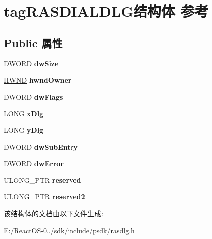 \hypertarget{structtag_r_a_s_d_i_a_l_d_l_g}{}\section{tag\+R\+A\+S\+D\+I\+A\+L\+D\+L\+G结构体 参考}
\label{structtag_r_a_s_d_i_a_l_d_l_g}
\subsection*{Public 属性}
\begin{DoxyCompactItemize}
\item 
\mbox{\label{structtag_r_a_s_d_i_a_l_d_l_g_a8b6b8c1e3844cb6f348f740876d2aac8}} 
D\+W\+O\+RD {\bfseries dw\+Size}
\item 
\mbox{\label{structtag_r_a_s_d_i_a_l_d_l_g_aa5a24f9ddd116f08714ce730776bec3b}} 
\hyperlink{interfacevoid}{H\+W\+ND} {\bfseries hwnd\+Owner}
\item 
\mbox{\label{structtag_r_a_s_d_i_a_l_d_l_g_ad66c305c5aa76b4f999e2ccc3d7c4127}} 
D\+W\+O\+RD {\bfseries dw\+Flags}
\item 
\mbox{\label{structtag_r_a_s_d_i_a_l_d_l_g_a3c20a6ac1a917e3a01e35307d1422533}} 
L\+O\+NG {\bfseries x\+Dlg}
\item 
\mbox{\label{structtag_r_a_s_d_i_a_l_d_l_g_abe09b5dcdf058799def98fead160b149}} 
L\+O\+NG {\bfseries y\+Dlg}
\item 
\mbox{\label{structtag_r_a_s_d_i_a_l_d_l_g_ad36afdcaa40910a8cedeec2bcde30131}} 
D\+W\+O\+RD {\bfseries dw\+Sub\+Entry}
\item 
\mbox{\label{structtag_r_a_s_d_i_a_l_d_l_g_ad4cb1a8614e0b94bda420bc1597740bd}} 
D\+W\+O\+RD {\bfseries dw\+Error}
\item 
\mbox{\label{structtag_r_a_s_d_i_a_l_d_l_g_a8ba1189f6ecd417b1f5dca001b41daf6}} 
U\+L\+O\+N\+G\+\_\+\+P\+TR {\bfseries reserved}
\item 
\mbox{\label{structtag_r_a_s_d_i_a_l_d_l_g_aae8f6472a1cf6c76d3ea2272cf7ab29d}} 
U\+L\+O\+N\+G\+\_\+\+P\+TR {\bfseries reserved2}
\end{DoxyCompactItemize}


该结构体的文档由以下文件生成\+:\begin{DoxyCompactItemize}
\item 
E\+:/\+React\+O\+S-\/0../sdk/include/psdk/rasdlg.\+h\end{DoxyCompactItemize}
